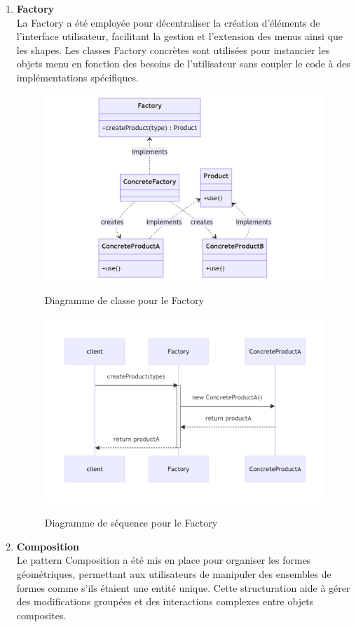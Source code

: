 \documentclass[a4paper,11pt]{article}
\begin{document}
\begin{enumerate}
    
\pagebreak
    \item \textbf{Factory} \\
    La Factory a été employée pour décentraliser la création d'éléments de l'interface utilisateur, facilitant la gestion et l'extension des menus ainsi que les shapes. Les classes Factory concrètes sont utilisées pour instancier les objets menu en fonction des besoins de l'utilisateur sans coupler le code à des implémentations spécifiques.

    \begin{figure} [!ht]
        \centering
        \caption{Diagramme de classe pour le Factory}
        \includegraphics[scale=0.3]{classe_factory.png}
        \label{fig:FactoryClassDiagram}
    \end{figure}

    \begin{figure} [!ht]
        \centering
        \caption{Diagramme de séquence pour le Factory}
        \includegraphics[scale=0.3]{sequence_factory.png}
        \label{fig:FactorySequenceDiagram}
    \end{figure}
\pagebreak
    \item \textbf{Composition} \\
    Le pattern Composition a été mis en place pour organiser les formes géométriques, permettant aux utilisateurs de manipuler des ensembles de formes comme s'ils étaient une entité unique. Cette structuration aide à gérer des modifications groupées et des interactions complexes entre objets composites.


\end{enumerate}
\end{document}
